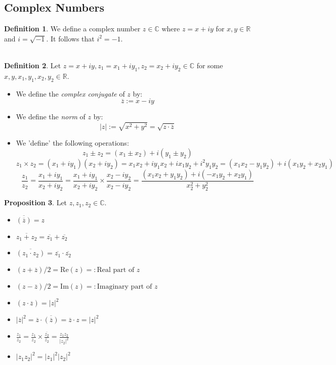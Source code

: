 \documentclass[11pt]{article}
\theoremstyle{definition}
\newtheorem{prop}{Proposition}[section]
\newtheorem{defn}[prop]{Definition}
\newcommand{\brac}[1]{\left(#1\right)}
\newcommand{\abs}[1]{\left\lvert#1\right\rvert}
\newcommand{\R}{\mathbb{R}}
\newcommand{\C}{\mathbb{C}}
\newcommand{\repart}[1]{\text{Re}\brac{#1}}
\newcommand{\impart}[1]{\text{Im}\brac{#1}}
\begin{document}
\subsection{Complex Numbers}
	\begin{defn}
		We define a complex number $z\in\C$ where $z=x+iy$ for $x,y\in \R$ and $i = \sqrt{-1}$. It follows that $i^2 = -1$.\\ \\
	\end{defn}
	\begin{defn}
		Let $z = x+iy, z_1 = x_1+iy_1, z_2 = x_2+iy_2\in\C$ for some $x,y,x_1,y_1,x_2,y_2\in\R$.
		\begin{itemize}
			\item We define the \emph{complex conjugate} of $z$ by:
			$$\overline{z} := x-iy$$
			\item We define the \emph{norm} of $z$ by:
			$$\abs{z} := \sqrt{x^2+y^2} = \sqrt{z\cdot\overline{z}}$$
			\item We 'define' the following operations:
				$$z_1 \pm z_2 = \brac{x_1 \pm x_2} + i\brac{y_1\pm y_2}$$
				$$z_1\times z_2 = \brac{x_1 + iy_1}\brac{x_2+iy_2}
				= x_1x_2 +iy_1x_2 + ix_1y_2 +i^2 y_1y_2 = \brac{x_1x_2 - y_1y_2} + i\brac{x_1y_2 + x_2y_1}$$
				$$\frac{z_1}{z_2} =\frac{x_1+iy_1}{x_2+iy_2}= \frac{x_1+iy_1}{x_2+iy_2}\times\frac{x_2-iy_2}{x_2-iy_2} = \frac{\brac{x_1x_2+y_1y_2}+i\brac{-x_1y_2 + x_2y_1}}{x_2^2+y_2^2}$$
		\end{itemize}
	\end{defn}
	\begin{prop}
		Let $z,z_1,z_2\in\C$.
		\begin{itemize}
			\item $\overline{\brac{\overline{z}}} = z$
			\item $\overline{z_1 + z_2} = \overline{z_1} + \overline{z_2}$
			\item $\overline{\brac{z_1\cdot z_2}} = \overline{z_1}\cdot \overline{z_2}$
			\item $\brac{z+\overline{z}}/2 = \repart{z}=:\text{Real part of } z$
			\item $\brac{z-\overline{z}}/2 = \impart{z}=:\text{Imaginary part of } z$
			\item $\brac{z\cdot\overline{z}} = \abs{z}^2$
			\item $\abs{\overline{z}}^2 = \overline{z}\cdot\overline{\brac{\overline{z}}} = \overline{z}\cdot z = \abs{z}^2$
			\item $\frac{z_1}{z_2} = \frac{z_1}{z_2}\times\frac{\overline{z_2}}{\overline{z_2}} = \frac{z_1z_2}{\abs{z_2}^2}$
			\item $\abs{z_1z_2}^2 = \abs{z_1}^2\abs{z_2}^2$
		\end{itemize}
	\end{prop}
\end{document}
